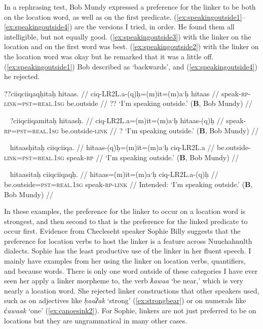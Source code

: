 In a rephrasing test, Bob Mundy expressed a preference for the linker to be both on the location word, as well as on the first predicate. (\ref{ex:speakingoutside1}--\ref{ex:speakingoutside4}) are the versions I tried, in order. He found them all intelligible, but not equally good. (\ref{ex:speakingoutside3}) with the linker on the location and on the first word was best. (\ref{ex:speakingoutside2}) with the linker on the location word was okay but he remarked that it was a little off. (\ref{ex:speakingoutside1}) Bob described as `backwards', and (\ref{ex:speakingoutside4}) he rejected.

\ex \label{ex:speakingoutside1}
\begingl
\glpreamble ??ciiqciiqaqḥitaḥ hitaas. //
\gla ciq-LR2L.a-(q)ḥ=(m)it=(m)aˑḥ hitaas //
\glb speak-\textsc{rp}-\textsc{link}=\textsc{pst}=\textsc{real.1sg} be.outside //
\glft ?? `I'm speaking outside.' (\textbf{B}, Bob Mundy) //
\endgl
\xe

\ex~ \label{ex:speakingoutside2}
\begingl
\glpreamble ?ciiqciiqamitaḥ hitaasḥ. //
\gla ciq-LR2L.a=(m)it=(m)aˑḥ hitaas-(q)ḥ //
\glb speak-\textsc{rp}=\textsc{pst}=\textsc{real.1sg} be.outside-\textsc{link} //
\glft ? `I'm speaking outside.' (\textbf{B}, Bob Mundy) //
\endgl
\xe

\ex~ \label{ex:speakingoutside3}
\begingl
\glpreamble hitaasḥitaḥ ciiqciiqa. //
\gla hitaas-(q)ḥ=(m)it=(m)aˑḥ ciq-LR2L.a //
\glb be.outside-\textsc{link}=\textsc{pst}=\textsc{real.1sg} speak-\textsc{rp} //
\glft `I'm speaking outside.' (\textbf{B}, Bob Mundy) //
\endgl
\xe

\ex~ \label{ex:speakingoutside4}
\begingl
\glpreamble *hitaasitaḥ ciiqciiqaqḥ. //
\gla hitaas=(m)it=(m)aˑḥ ciq-LR2L.a-(q)ḥ //
\glb be.outside=\textsc{pst}=\textsc{real.1sg} speak-\textsc{rp}-\textsc{link} //
\glft Intended: `I'm speaking outside.' (\textbf{B}, Bob Mundy) //
\endgl
\xe

\vspace{-15pt}

In these examples, the preference for the linker to occur on a location word is strongest, and then second to that is the preference for the linked predicate to occur first. Evidence from Checleseht speaker Sophie Billy suggests that the preference for location verbs to host the linker is a feature across Nuuchahnulth dialects. Sophie has the least productive use of the linker in her fluent speech. I mainly have examples from her using the linker on location verbs, quantifiers, and because words. There is only one word outside of these categories I have ever seen her apply a linker morpheme to, the verb \textit{ƛawaa} `be near,' which is very nearly a location word. She rejected linker constructions that other speakers used, such as on adjectives like \textit{ḥaaʔak} `strong' (\ref{ex:strongbear}) or on numerals like \textit{c̓awaak} `one' (\ref{ex:canoesink2}). For Sophie, linkers are not just preferred to be on locations but they are ungrammatical in many other cases.

